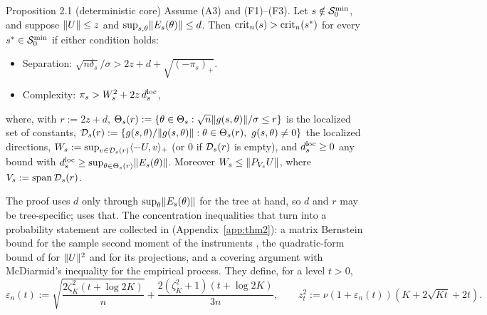 \begin{result}[Proposition2.1]{Proposition 2.1 (deterministic core)}
Assume (A3) and (F1)--(F3). Let $s \notin \mathcal{S}_0^{\min}$, and suppose $\lVert U\rVert \le z$ and $\sup_{s,\theta}\lVert E_s(\theta)\rVert \le d$. Then $\mathrm{crit}_n(s) > \mathrm{crit}_n(s^*)$ for every $s^* \in \mathcal{S}_0^{\min}$ if either condition holds:
\begin{itemize}
\item[(I)] Separation: $\sqrt{n\delta_s}/\sigma > 2z + d + \sqrt{(-\pi_s)_+}$.
\item[(II)] Complexity: $\pi_s > W_s^2 + 2z\,d^{\mathrm{loc}}_s$,
\end{itemize}
where, with $r := 2z + d$, $\Theta_s(r) := \{\theta \in \Theta_s : \sqrt n\lVert g(s,\theta)\rVert/\sigma \le r\}$ is the localized set of constants, $\mathcal{D}_s(r) := \{g(s,\theta)/\lVert g(s,\theta)\rVert : \theta \in \Theta_s(r),\ g(s,\theta) \ne 0\}$ the localized directions, $W_s := \sup_{v \in \mathcal{D}_s(r)}\langle -U, v\rangle_+$ (or $0$ if $\mathcal{D}_s(r)$ is empty), and $d^{\mathrm{loc}}_s \ge 0$ any bound with $d^{\mathrm{loc}}_s \ge \sup_{\theta \in \Theta_s(r)}\lVert E_s(\theta)\rVert$. Moreover $W_s \le \lVert P_{V_s}U\rVert$, where $V_s := \mathrm{span}\,\mathcal{D}_s(r)$.
\end{result}

The proof uses $d$ only through $\sup_\theta\lVert E_s(\theta)\rVert$ for the tree at hand, so $d$ and $r$ may be tree-specific;  uses that. The concentration inequalities that turn  into a probability statement are collected in  (Appendix~\ref{app:thm2}): a matrix Bernstein bound for the sample second moment of the instruments \citep{tropp2012}, the quadratic-form bound of \citet{hsukakadezhang2012} for $\lVert U\rVert^2$ and for its projections, and a covering argument with McDiarmid's inequality for the empirical process. They define, for a level $t > 0$,
\[
\varepsilon_n(t) := \sqrt{\frac{2\zeta_K^2(t + \log 2K)}{n}} + \frac{2(\zeta_K^2 + 1)(t + \log 2K)}{3n}, \qquad z_t^2 := \nu(1 + \varepsilon_n(t))(K + 2\sqrt{Kt} + 2t).
\]

